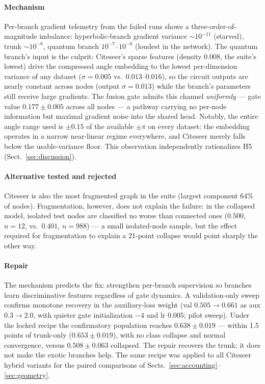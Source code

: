 \documentclass[pdflatex,sn-mathphys-num]{sn-jnl}
\begin{document}
\paragraph{Mechanism} Per-branch gradient telemetry from the failed runs shows a three-order-of-magnitude imbalance: hyperbolic-branch gradient variance ${\sim}10^{-11}$ (starved), trunk ${\sim}10^{-8}$, quantum branch $10^{-7}$--$10^{-6}$ (loudest in the network). The quantum branch's input is the culprit: Citeseer's sparse features (density $0.008$, the suite's lowest) drive the compressed angle embedding to the lowest per-dimension variance of any dataset ($\sigma=0.005$ vs.\ $0.013$--$0.016$), so the circuit outputs are nearly constant across nodes (output $\sigma=0.013$) while the branch's parameters still receive large gradients. The fusion gate admits this channel \emph{uniformly} --- gate value $0.177\pm0.005$ across all nodes --- a pathway carrying no per-node information but maximal gradient noise into the shared head. Notably, the entire angle range used is $\pm0.15$ of the available $\pm\pi$ on every dataset: the embedding operates in a narrow near-linear regime everywhere, and Citeseer merely falls below the usable-variance floor. This observation independently rationalizes H5 (Sect.~\ref{sec:discussion}).

\paragraph{Alternative tested and rejected} Citeseer is also the most fragmented graph in the suite (largest component 64\% of nodes). Fragmentation, however, does not explain the failure: in the collapsed model, isolated test nodes are classified no worse than connected ones ($0.500$, $n=12$, vs.\ $0.401$, $n=988$) --- a small isolated-node sample, but the effect required for fragmentation to explain a 21-point collapse would point sharply the other way.

\paragraph{Repair} The mechanism predicts the fix: strengthen per-branch supervision so branches learn discriminative features regardless of gate dynamics. A validation-only sweep confirms monotone recovery in the auxiliary-loss weight (val $0.505 \to 0.661$ as aux $0.3 \to 2.0$, with quieter gate initialization $-4$ and lr $0.005$; pilot sweep). Under the locked recipe the confirmatory population reaches $0.638\pm0.019$ --- within 1.5 points of trunk-only ($0.653\pm0.019$), with no class collapse and normal convergence, versus $0.508\pm0.063$ collapsed. The repair recovers the trunk; it does not make the exotic branches help. The same recipe was applied to all Citeseer hybrid variants for the paired comparisons of Sects.~\ref{sec:accounting}--\ref{sec:geometry}.
\end{document}

